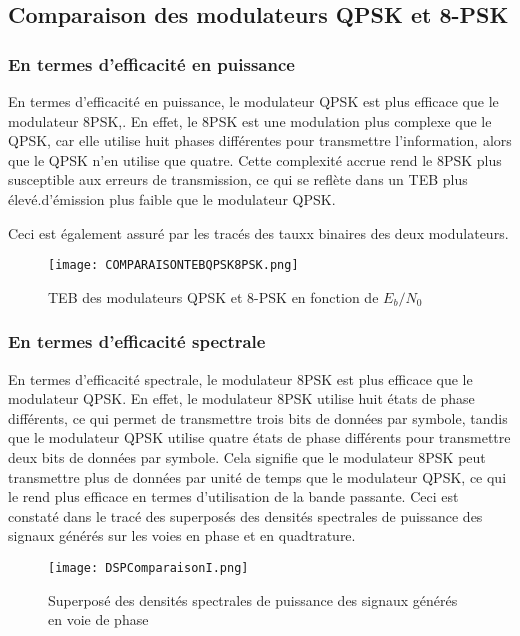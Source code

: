 \documentclass[11pt]{article}
\begin{document}
\subsection{Comparaison des modulateurs QPSK et 8-PSK}
\subsubsection{En termes d'efficacité en puissance}
En termes d'efficacité en puissance, le modulateur QPSK est plus efficace que le modulateur 8PSK,. En effet, le 8PSK est une modulation plus complexe que le QPSK, car elle utilise huit phases différentes pour transmettre l'information, alors que le QPSK n'en utilise que quatre. Cette complexité accrue rend le 8PSK plus susceptible aux erreurs de transmission, ce qui se reflète dans un TEB plus élevé.d'émission plus faible que le modulateur QPSK.

Ceci est également assuré par les tracés des tauxx binaires des deux modulateurs.

\begin{figure}[ht!]
    \centering
    \texttt{[image: COMPARAISONTEBQPSK8PSK.png]}
    \caption{TEB des modulateurs QPSK et 8-PSK en fonction de $E_b/N_0$  \label{fig : TEB8PSKQPSK}}
\end{figure}

\subsubsection{En termes d'efficacité spectrale}

En termes d'efficacité spectrale, le modulateur 8PSK est plus efficace que le modulateur QPSK. En effet, le modulateur 8PSK utilise huit états de phase différents, ce qui permet de transmettre trois bits de données par symbole, tandis que le modulateur QPSK utilise quatre états de phase différents pour transmettre deux bits de données par symbole. Cela signifie que le modulateur 8PSK peut transmettre plus de données par unité de temps que le modulateur QPSK, ce qui le rend plus efficace en termes d'utilisation de la bande passante.
Ceci est constaté dans le tracé des superposés des densités spectrales de puissance des signaux générés sur les voies en phase et en quadtrature.

\begin{figure}[ht!]
    \centering
    \texttt{[image: DSPComparaisonI.png]}
    \caption{Superposé des densités spectrales de puissance des signaux générés en voie de phase \label{fig : ComparPhase}}
\end{figure}
\end{document}
